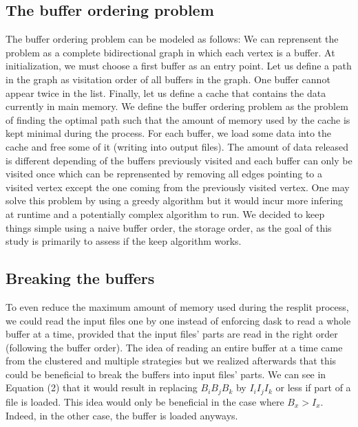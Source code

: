 \documentclass[conference]{IEEEtran}
\begin{document}
\subsection{The buffer ordering problem}
The buffer ordering problem can be modeled as follows: We can reprensent the
problem as a complete bidirectional graph in which each vertex is a buffer. At
initialization, we must choose a first buffer as an entry point. Let us define
a path in the graph as visitation order of all buffers in the graph. One buffer
cannot appear twice in the list. Finally, let us define a cache that contains
the data currently in main memory. We define the buffer ordering problem as the
problem of finding the optimal path such that the amount of memory used by the
cache is kept minimal during the process. For each buffer, we load some data
into the cache and free some of it (writing into output files). The amount of
data released is different depending of the buffers previously visited and each
buffer can only be visited once which can be reprensented by removing all edges
pointing to a visited vertex except the one coming from the previously visited
vertex. One may solve this problem by using a greedy algorithm but it would
incur more infering at runtime and a potentially complex algorithm to run.
We decided to keep things simple using a naive buffer order, the storage order,
as the goal of this study is primarily to assess if the keep algorithm works.

\subsection{Breaking the buffers}
To even reduce the maximum amount of memory used during the resplit process, we
could read the input files one by one instead of enforcing dask to read a whole
buffer at a time, provided that the input files' parts are read in the right
order (following the buffer order). The idea of reading an entire buffer at a
time came from the clustered and multiple strategies but we realized afterwards
that this could be beneficial to break the buffers into input files' parts. We
can see in Equation (2) that it would result in replacing $B_iB_jB_k$ by
$I_iI_jI_k$ or less if part of a file is loaded. This idea would only be
beneficial in the case where $B_x>I_x$. Indeed, in the other case, the buffer is
loaded anyways.
\end{document}
